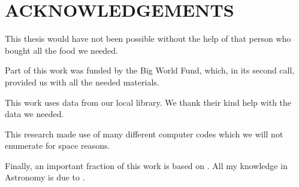 \chapter*{ACKNOWLEDGEMENTS} 

This thesis would have not been possible without the help of that
      person who bought all the food we needed.
      
      Part of this work was funded by the Big World Fund, which, in
      its second call, provided us with all the needed materials.
      
      This work uses data from our local library. We thank their
      kind help with the data we needed.
      
      This research made use of many different computer codes which
      we will not enumerate for space reasons.

      Finally, an important fraction of this work is based on 
      \citet[][, hereafter C17]{carroll_ostlie_2017}. All my knowledge in Astronomy is due to .

%
